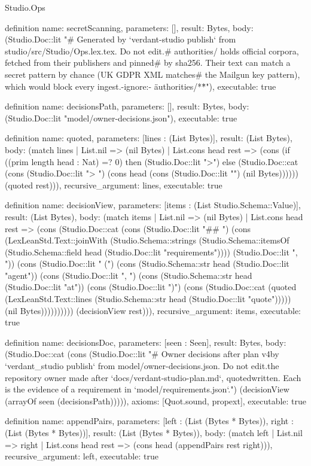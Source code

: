 \begin{lexlean}{Studio.Ops}
\begin{semanticmodule}
{definition{
  name: secretScanning,
  parameters: [],
  result: Bytes,
  body: (Studio.Doc::lit "# Generated by `verdant-studio publish` from studio/src/Studio/Ops.lex.tex. Do not edit.\n# authorities/ holds official corpora, fetched from their publishers and pinned\n# by sha256. Their text can match a secret pattern by chance (UK GDPR XML matches\n# the Mailgun key pattern), which would block every ingest.\npaths-ignore:\n  - \"authorities/**\"\n"),
  executable: true
}

definition{
  name: decisionsPath,
  parameters: [],
  result: Bytes,
  body: (Studio.Doc::lit "model/owner-decisions.json"),
  executable: true
}

definition{
  name: quoted,
  parameters: [lines : (List Bytes)],
  result: (List Bytes),
  body: (match lines
    | List.nil => (nil Bytes)
    | List.cons head rest => (cons (if ((prim length head : Nat) =? 0) then (Studio.Doc::lit ">\n") else (Studio.Doc::cat (cons (Studio.Doc::lit "> ") (cons head (cons (Studio.Doc::lit "\n") (nil Bytes)))))) (quoted rest))),
  recursive_argument: lines,
  executable: true
}

definition{
  name: decisionView,
  parameters: [items : (List Studio.Schema::Value)],
  result: (List Bytes),
  body: (match items
    | List.nil => (nil Bytes)
    | List.cons head rest => (cons (Studio.Doc::cat (cons (Studio.Doc::lit "\n## ") (cons (LexLeanStd.Text::joinWith (Studio.Schema::strings (Studio.Schema::itemsOf (Studio.Schema::field head (Studio.Doc::lit "requirements")))) (Studio.Doc::lit ", ")) (cons (Studio.Doc::lit " (") (cons (Studio.Schema::str head (Studio.Doc::lit "agent")) (cons (Studio.Doc::lit ", ") (cons (Studio.Schema::str head (Studio.Doc::lit "at")) (cons (Studio.Doc::lit ")\n\n") (cons (Studio.Doc::cat (quoted (LexLeanStd.Text::lines (Studio.Schema::str head (Studio.Doc::lit "quote"))))) (nil Bytes)))))))))) (decisionView rest))),
  recursive_argument: items,
  executable: true
}

definition{
  name: decisionsDoc,
  parameters: [seen : Seen],
  result: Bytes,
  body: (Studio.Doc::cat (cons (Studio.Doc::lit "# Owner decisions after plan v4\n\nGenerated by `verdant_studio publish` from model/owner-decisions.json. Do not edit.\nDecisions the repository owner made after `docs/verdant-studio-plan.md`, quoted\nas written. Each is the evidence of a requirement in `model/requirements.json`.\n") (decisionView (arrayOf seen (decisionsPath))))),
  axioms: [Quot.sound, propext],
  executable: true
}

definition{
  name: appendPairs,
  parameters: [left : (List (Bytes * Bytes)), right : (List (Bytes * Bytes))],
  result: (List (Bytes * Bytes)),
  body: (match left
    | List.nil => right
    | List.cons head rest => (cons head (appendPairs rest right))),
  recursive_argument: left,
  executable: true
}

}
\end{semanticmodule}
\end{lexlean}
